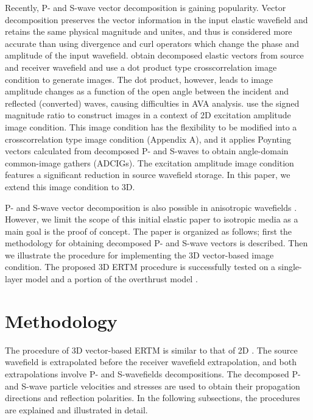 \documentclass[manuscript,ulem,graphix,revised]{geophysics}
\begin{document}
Recently, P- and S-wave vector decomposition \citep{ma03,zhang07,wenlong_cmp15,wenlong_pv16,zhu17,wenlong17} is gaining popularity. Vector decomposition preserves the vector information in the input elastic wavefield and retains the same physical magnitude and unites, and thus is considered more accurate than using divergence and curl operators which change the phase and amplitude of the input wavefield. \citet{wang_cl16} obtain decomposed elastic vectors from source and receiver wavefield and use a dot product type crosscorrelation image condition to generate images. The dot product, however, leads to image amplitude changes as a function of the open angle between the incident and reflected (converted) waves, causing difficulties in AVA analysis. \citet{wenlong_vct15} use the signed magnitude ratio to construct images in a context of 2D excitation amplitude image condition. This image condition has the flexibility to be modified into a crosscorrelation type image condition (Appendix A), and it applies Poynting vectors \citep{cerveny01} calculated from decomposed P- and S-waves to obtain angle-domain common-image gathers (ADCIGs). The excitation amplitude image condition features a significant reduction in source wavefield storage. In this paper, we extend this image condition to 3D.

P- and S-wave vector decomposition is also possible in anisotropic wavefields \citep{cheng14,wenlong17}. However, we limit the scope of this initial elastic paper to isotropic media as a main goal is the proof of concept. The paper is organized as follows; first the methodology for obtaining decomposed P- and S-wave vectors is described. Then we illustrate the procedure for implementing the 3D vector-based image condition.
The proposed 3D ERTM procedure is successfully tested on a single-layer model and a portion of the overthrust model \citep{aminzadeh94}. 

\section{Methodology}

The procedure of 3D vector-based ERTM is similar to that of 2D \citep{wenlong_vct15}. The source wavefield is extrapolated before the receiver wavefield extrapolation, and both extrapolations involve P- and S-wavefields decompositions. The decomposed P- and S-wave particle velocities and stresses are used to obtain their propagation directions and reflection polarities. 
In the following subsections, the procedures are explained and illustrated in detail.
\end{document}
